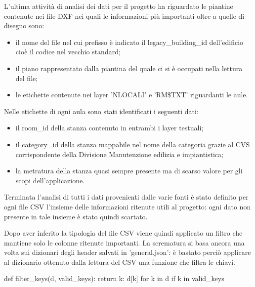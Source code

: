 \documentclass[12pt]{report}
\begin{document}
\vspace{5mm} %

L'ultima attività di analisi dei dati per il progetto ha riguardato le piantine contenute nei file DXF nei quali le informazioni più importanti oltre a quelle di disegno sono:
\begin{itemize}
\item il nome del file nel cui prefisso è indicato il legacy\_building\_id dell'edificio cioè il codice nel vecchio standard;
\item il piano rappresentato dalla piantina del quale ci si è occupati nella lettura del file;
\item le etichette contenute nei layer 'NLOCALI' e 'RM\$TXT' riguardanti le aule.
\end{itemize}  

\newpage

Nelle etichette di ogni aula sono stati identificati i seguenti dati:
\begin{itemize}
\item il room\_id della stanza contenuto in entrambi i layer testuali;
\item il category\_id della stanza mappabile nel nome della categoria grazie al CVS corrispondente della Divisione Manutenzione edilizia e impiantistica;
\item la metratura della stanza quasi sempre presente ma di scarso valore per gli scopi dell'applicazione.
\end{itemize}  

\vspace{5mm} %

Terminata l'analisi di tutti i dati provenienti dalle varie fonti è stato definito per ogni file CSV l'insieme delle informazioni ritenute utili al progetto: ogni dato non presente in tale insieme è stato quindi scartato.

Dopo aver inferito la tipologia del file CSV viene quindi applicato un filtro che mantiene solo le colonne ritenute importanti. 
La scrematura si basa ancora una volta sui dizionari degli header salvati in 'general.json': è bastato perciò applicare al dizionario ottenuto dalla lettura del CSV una funzione che filtra le chiavi.
\begin{python}[title=Definizione della funzione filter\_keys, frame=single]
def filter_keys(d, valid_keys):
   return { k: d[k] for k in d if k in valid_keys }
\end{python}

\vspace{5mm} %
\end{document}

